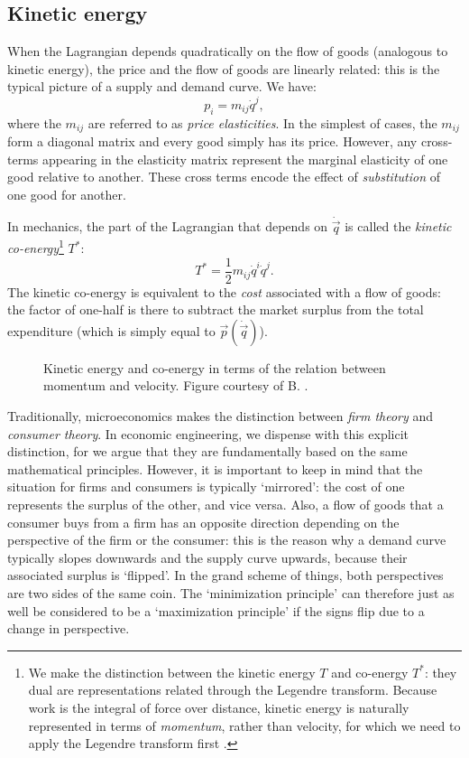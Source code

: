 \subsection{Kinetic energy} When the Lagrangian depends quadratically on the flow of goods (analogous to kinetic energy), the price and the flow of goods are linearly related: this is the typical picture of a supply and demand curve. We have:
\begin{equation}
     p_i = m_{ij} \dot{q}^j,
\end{equation}
where the \(m_{ij}\) are referred to as \emph{price elasticities}. In the simplest of cases, the \(m_{ij}\) form a diagonal matrix and every good simply has its price. However, any cross-terms appearing in the elasticity matrix represent the marginal elasticity of one good relative to another. These cross terms encode the effect of \emph{substitution} of one good for another. 

In mechanics, the part of the Lagrangian that depends on \(\dot{\vec{q}}\) is called the \emph{kinetic co-energy}\footnote{We make the distinction between the kinetic energy \(T\) and co-energy \(T^*\): they dual are representations related through the Legendre transform. Because work is the integral of force over distance, kinetic energy is naturally represented in terms of \emph{momentum}, rather than velocity, for which we need to apply the Legendre transform first \cite{Jeltsema2009}.} \(T^*\):
\begin{equation}
    T^* = \frac{1}{2}m_{ij}\dot{q}^i \dot{q}^j.
\end{equation} 
The kinetic co-energy is equivalent to the \emph{cost} associated with a flow of goods: the factor of one-half is there to subtract the market surplus from the total expenditure (which is simply equal to \(\vec{p}(\dot{\vec{q}})\)).

\begin{figure}
    \centering
    
    \caption{Kinetic energy and co-energy in terms of the relation between momentum and velocity. Figure courtesy of B. \citet{Krabbenborg2021}.}
    \label{fig:kinetic_energy}
\end{figure}

Traditionally, microeconomics makes the distinction between \emph{firm theory} and \emph{consumer theory}. In economic engineering, we dispense with this explicit distinction, for we argue that they are fundamentally based on the same mathematical principles. However, it is important to keep in mind that the situation for firms and consumers is typically `mirrored': the cost of one represents the surplus of the other, and vice versa. Also, a flow of goods that a consumer buys from a firm has an opposite direction depending on the perspective of the firm or the consumer: this is the reason why a demand curve typically slopes downwards and the supply curve upwards, because their associated surplus is `flipped'. In the grand scheme of things, both perspectives are two sides of the same coin. The `minimization principle' can therefore just as well be considered to be a `maximization principle' if the signs flip due to a change in perspective.

